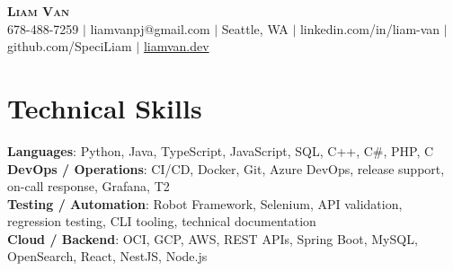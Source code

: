 \documentclass[letterpaper,11pt]{article}
\begin{document}

%
\begin{center}
    \textbf{\Huge \scshape Liam Van} \\ \vspace{1pt}
    \small 678-488-7259 $|$ \small {liamvanpj@gmail.com} $|$ Seattle, WA
 {{$|$ linkedin.com/in/liam-van} {$|$ github.com/SpeciLiam} {$|$ \href{https://liamvan.dev}{liamvan.dev}}}

\end{center}

\section{Technical Skills}
 \begin{itemize}[leftmargin=0.15in, label={}]
    \small{\item{
     \textbf{Languages}{: Python, Java, TypeScript, JavaScript, SQL, C++, C\#, PHP, C} \\
     \textbf{DevOps / Operations}{: CI/CD, Docker, Git, Azure DevOps, release support, on-call response, Grafana, T2} \\
     \textbf{Testing / Automation}{: Robot Framework, Selenium, API validation, regression testing, CLI tooling, technical documentation} \\
     \textbf{Cloud / Backend}{: OCI, GCP, AWS, REST APIs, Spring Boot, MySQL, OpenSearch, React, NestJS, Node.js} \\
    }}
 \end{itemize}
%

\end{document}
